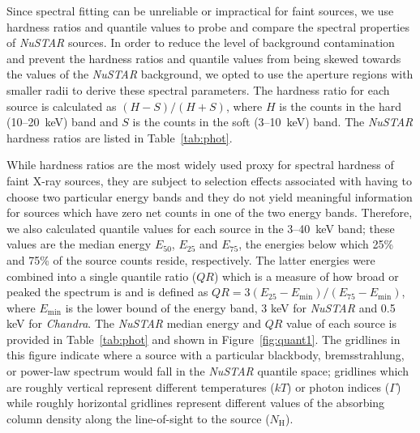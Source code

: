 \documentclass[iop,revtex4]{emulateapj}
\begin{document}
Since spectral fitting can be unreliable or impractical for faint sources, we use hardness ratios and quantile values \citep{hong04} to probe and compare the spectral properties of \textit{NuSTAR} sources.  In order to reduce the level of background contamination and prevent the hardness ratios and quantile values from being skewed towards the values of the \textit{NuSTAR} background, we opted to use the aperture regions with smaller radii to derive these spectral parameters.  The hardness ratio for each source is calculated as $(H-S)/(H+S)$, where $H$ is the counts in the hard (10--20~keV) band and $S$ is the counts in the soft (3--10~keV) band.  The \textit{NuSTAR} hardness ratios are listed in Table~\ref{tab:phot}.  \par
While hardness ratios are the most widely used proxy for spectral hardness of faint X-ray sources, they are subject to selection effects associated with having to choose two particular energy bands and they do not yield meaningful information for sources which have zero net counts in one of the two energy bands.  Therefore, we also calculated quantile values for each source in the 3--40~keV band; these values are the median energy $E_{50}$, $E_{25}$ and $E_{75}$, the energies below which 25\% and 75\% of the source counts reside, respectively.  The latter energies were combined into a single quantile ratio ($QR$) which is a measure of how broad or peaked the spectrum is and is defined as $QR = 3 (E_{25}-E_{\mathrm{min}})/(E_{75}-E_{\mathrm{min}})$, where $E_{\mathrm{min}}$ is the lower bound of the energy band, 3 keV for \textit{NuSTAR} and 0.5 keV for \textit{Chandra}.  The \textit{NuSTAR} median energy and $QR$ value of each source is provided in Table~\ref{tab:phot} and shown in Figure~\ref{fig:quant1}.  The gridlines in this figure indicate where a source with a particular blackbody, bremsstrahlung, or power-law spectrum would fall in the \textit{NuSTAR} quantile space; gridlines which are roughly vertical represent different temperatures ($kT$) or photon indices ($\Gamma$) while roughly horizontal gridlines represent different values of the absorbing column density along the line-of-sight to the source ($N_{\mathrm{H}}$).  \par
\end{document}
